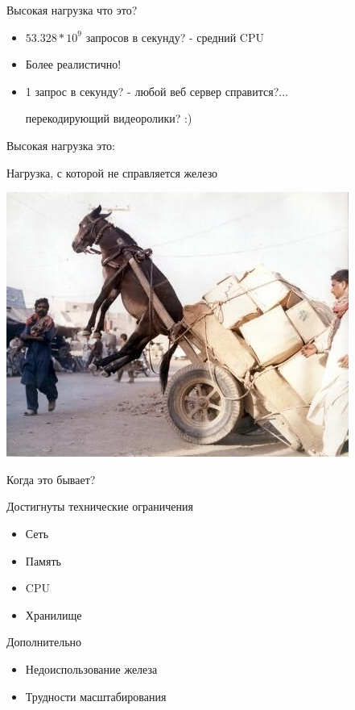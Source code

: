 \documentclass[aspectratio=169]{beamer}
\begin{document}
\begin{frame}{Высокая нагрузка что это?}
    \begin{itemize}

        \pause
        \item $53.328 * 10^9$  запросов в секунду?
            \pause
            {\small - средний CPU}

        \pause
        \item Более реалистично!

        \pause
        \item 1 запрос в секунду?
            \pause
            - любой веб сервер справится?...
            \pause
            \par {\small перекодирующий видеоролики? :)}
    \end{itemize}
\end{frame}

\begin{frame}{Высокая нагрузка это:}
    \pause
    \begin{center}
        {\huge Нагрузка, с которой не справляется железо}
    \end{center}
    \begin{center}
        \pause\includegraphics[scale=0.45]{img/ia.jpg}
    \end{center}
\end{frame}

\begin{frame}{Когда это бывает?}
    \begin{block}{Достигнуты технические ограничения}
        \begin{itemize}
            \item Сеть
            \item Память
            \item CPU
            \item Хранилище
        \end{itemize}
    \end{block}
    \begin{block}{Дополнительно}
        \begin{itemize}
            \item Недоиспользование железа
            \item Трудности масштабирования
        \end{itemize}
    \end{block}
\end{frame}
\end{document}
